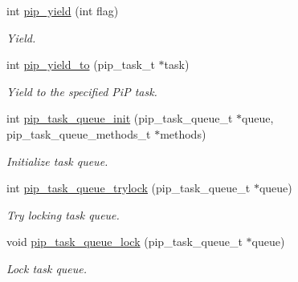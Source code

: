 \begin{DoxyCompactItemize}
\item 
int \hyperlink{group__libpip_ga50469f21446ce86ea18ddd282cf15894}{pip\-\_\-yield} (int flag)
\begin{DoxyCompactList}\small\item\em Yield. \end{DoxyCompactList}\end{DoxyCompactItemize}
\begin{DoxyCompactItemize}
\item 
int \hyperlink{group__libpip_gac30cf124b28a8d80dac34c5e1bdb66ba}{pip\-\_\-yield\-\_\-to} (pip\-\_\-task\-\_\-t $\ast$task)
\begin{DoxyCompactList}\small\item\em Yield to the specified Pi\-P task. \end{DoxyCompactList}\end{DoxyCompactItemize}
\begin{DoxyCompactItemize}
\item 
int \hyperlink{group__libpip_ga9c50d9b2b810d97a75a5fe9c332902e0}{pip\-\_\-task\-\_\-queue\-\_\-init} (pip\-\_\-task\-\_\-queue\-\_\-t $\ast$queue, pip\-\_\-task\-\_\-queue\-\_\-methods\-\_\-t $\ast$methods)
\begin{DoxyCompactList}\small\item\em Initialize task queue. \end{DoxyCompactList}\end{DoxyCompactItemize}
\begin{DoxyCompactItemize}
\item 
int \hyperlink{group__libpip_ga20d50746c585f1ede68f2c9aefc39a5c}{pip\-\_\-task\-\_\-queue\-\_\-trylock} (pip\-\_\-task\-\_\-queue\-\_\-t $\ast$queue)
\begin{DoxyCompactList}\small\item\em Try locking task queue. \end{DoxyCompactList}\end{DoxyCompactItemize}
\begin{DoxyCompactItemize}
\item 
void \hyperlink{group__libpip_gaf7f6e26e29752a148704108bdcc7756f}{pip\-\_\-task\-\_\-queue\-\_\-lock} (pip\-\_\-task\-\_\-queue\-\_\-t $\ast$queue)
\begin{DoxyCompactList}\small\item\em Lock task queue. \end{DoxyCompactList}\end{DoxyCompactItemize}
